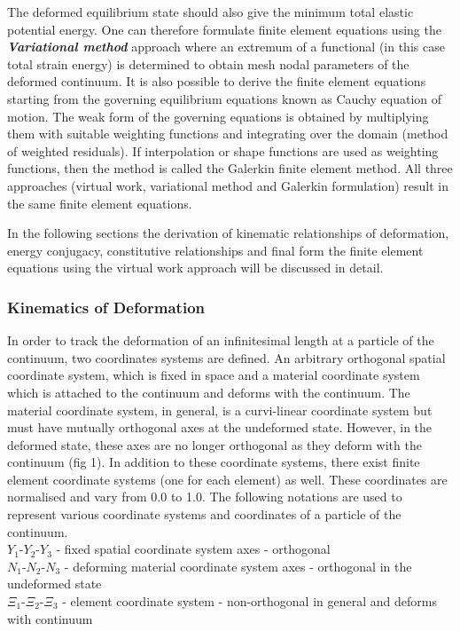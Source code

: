 The deformed equilibrium state should also give the minimum total elastic potential energy. One can therefore formulate finite element equations 
using the \textit{\textbf{Variational method}} approach where an extremum of a functional (in this case total strain energy) is determined to 
obtain mesh nodal parameters of the deformed continuum. It is also possible to derive the finite element equations starting from the governing
equilibrium equations known as Cauchy equation of motion. The weak form of the governing equations is obtained by multiplying them with suitable
weighting functions and integrating over the domain (method of weighted residuals). If interpolation or shape functions are used as weighting 
functions, then the method is called the Galerkin finite element method. All three approaches (virtual work, variational method and 
Galerkin formulation) result in the same finite element equations.     

In the following sections the derivation of kinematic relationships of deformation, energy conjugacy, constitutive relationships and final form 
the finite element equations using the virtual work approach will be discussed in detail.

\subsubsection{Kinematics of Deformation}
In order to track the deformation of an infinitesimal length at a particle of the continuum, two coordinates systems are defined. An arbitrary
orthogonal spatial coordinate system, which is fixed in space and a material coordinate system which is attached to the continuum and deforms 
with the continuum. The material coordinate system, in general, is a curvi-linear coordinate system but must have mutually orthogonal axes at the
undeformed state. However, in the deformed state, these axes are no longer orthogonal as they deform with the continuum (fig 1). In addition
to these coordinate systems, there exist finite element coordinate systems (one for each element) as well. These coordinates are normalised and 
vary from 0.0 to 1.0. The following notations are used to represent various coordinate systems and coordinates of a particle of the continuum.\\

\noindent $Y_{1}$-$Y_{2}$-$Y_{3}$ - fixed spatial coordinate system axes - orthogonal\\
$N_{1}$-$N_{2}$-$N_{3}$ - deforming material coordinate system axes  - orthogonal in the undeformed state\\
$\Xi_{1}$-$\Xi_{2}$-$\Xi_{3}$ - element coordinate system - non-orthogonal in general and deforms with continuum\\

